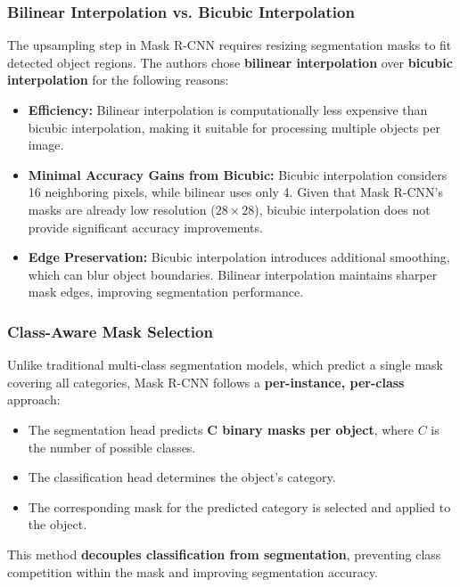 \subsubsection{Bilinear Interpolation vs. Bicubic Interpolation}

\noindent The upsampling step in Mask R-CNN requires resizing segmentation masks to fit detected object regions. The authors chose \textbf{bilinear interpolation} over \textbf{bicubic interpolation} for the following reasons:

\begin{itemize}
	\item \textbf{Efficiency:} Bilinear interpolation is computationally less expensive than bicubic interpolation, making it suitable for processing multiple objects per image.
	\item \textbf{Minimal Accuracy Gains from Bicubic:} Bicubic interpolation considers 16 neighboring pixels, while bilinear uses only 4. Given that Mask R-CNN’s masks are already low resolution ($28 \times 28$), bicubic interpolation does not provide significant accuracy improvements.
	\item \textbf{Edge Preservation:} Bicubic interpolation introduces additional smoothing, which can blur object boundaries. Bilinear interpolation maintains sharper mask edges, improving segmentation performance.
\end{itemize}

\subsubsection{Class-Aware Mask Selection}

\noindent Unlike traditional multi-class segmentation models, which predict a single mask covering all categories, Mask R-CNN follows a \textbf{per-instance, per-class} approach:

\begin{itemize}
	\item The segmentation head predicts \textbf{C binary masks per object}, where $C$ is the number of possible classes.
	\item The classification head determines the object’s category.
	\item The corresponding mask for the predicted category is selected and applied to the object.
\end{itemize}

\noindent This method \textbf{decouples classification from segmentation}, preventing class competition within the mask and improving segmentation accuracy.

